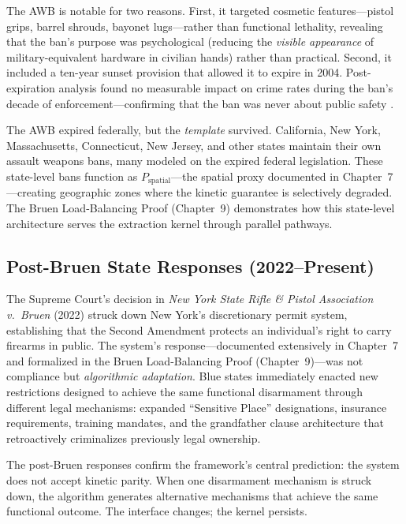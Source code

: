 \documentclass[12pt,openany]{book}
\begin{document}
The AWB is notable for two reasons. First, it targeted cosmetic features---pistol grips, barrel shrouds, bayonet lugs---rather than functional lethality, revealing that the ban's purpose was psychological (reducing the \textit{visible appearance} of military-equivalent hardware in civilian hands) rather than practical. Second, it included a ten-year sunset provision that allowed it to expire in 2004. Post-expiration analysis found no measurable impact on crime rates during the ban's decade of enforcement---confirming that the ban was never about public safety \cite{koper2004}.

The AWB expired federally, but the \textit{template} survived. California, New York, Massachusetts, Connecticut, New Jersey, and other states maintain their own assault weapons bans, many modeled on the expired federal legislation. These state-level bans function as $P_{\text{spatial}}$---the spatial proxy documented in Chapter~7---creating geographic zones where the kinetic guarantee is selectively degraded. The Bruen Load-Balancing Proof (Chapter~9) demonstrates how this state-level architecture serves the extraction kernel through parallel pathways.

\subsection{Post-Bruen State Responses (2022--Present)}

The Supreme Court's decision in \textit{New York State Rifle \& Pistol Association v.\ Bruen} (2022) struck down New York's discretionary permit system, establishing that the Second Amendment protects an individual's right to carry firearms in public. The system's response---documented extensively in Chapter~7 and formalized in the Bruen Load-Balancing Proof (Chapter~9)---was not compliance but \textit{algorithmic adaptation}. Blue states immediately enacted new restrictions designed to achieve the same functional disarmament through different legal mechanisms: expanded ``Sensitive Place'' designations, insurance requirements, training mandates, and the grandfather clause architecture that retroactively criminalizes previously legal ownership.

The post-Bruen responses confirm the framework's central prediction: the system does not accept kinetic parity. When one disarmament mechanism is struck down, the algorithm generates alternative mechanisms that achieve the same functional outcome. The interface changes; the kernel persists.
\end{document}
